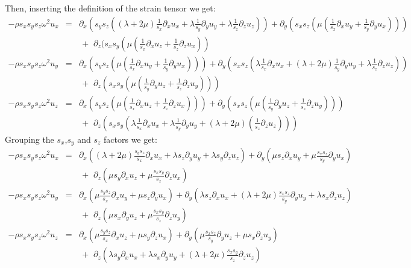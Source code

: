 \documentclass[onecolumn,extra]{gji_modified_cours_UPPA}
\begin{document}
\noindent Then, inserting the definition of the strain tensor we get:
\begin{eqnarray}
-\rho s_x s_y s_z \omega^2 u_x& = &\partial_x (s_y s_z ((\lambda + 2 \mu)\frac{1}{s_x}\partial_x u_x + \lambda\frac{1}{s_y}\partial_y u_y + \lambda\frac{1}{s_z}\partial_z u_z))
+ \partial_y (s_x s_z (\mu (\frac{1}{s_x} \partial_x u_y + \frac{1}{s_y} \partial_y u_x))) \nonumber \\
&\,& \,+\,\, \partial_z (s_x s_y (\mu(\frac{1}{s_x} \partial_x u_z + \frac{1}{s_z}\partial_z u_x)) \nonumber \\
-\rho s_x s_y s_z \omega^2 u_y  & = &  \partial_x (s_y s_z (\mu(\frac{1}{s_x} \partial_x u_y + \frac{1}{s_y}\partial_y u_x)))
+ \partial_y (s_x s_z (\lambda\frac{1}{s_x}\partial_x u_x + (\lambda + 2 \mu)\frac{1}{s_y}\partial_y u_y + \lambda\frac{1}{s_z}\partial_z u_z))\nonumber \\
&\,& \,+\,\, \partial_z (s_x s_y (\mu(\frac{1}{s_y} \partial_y u_z + \frac{1}{s_z} \partial_z u_y))) \nonumber \\
- \rho s_x s_y s_z \omega^2 u_z  & = &  \partial_x (s_y s_z (\mu(\frac{1}{s_x} \partial_x u_z + \frac{1}{s_z} \partial_z u_x)))
+ \partial_y (s_x s_z (\mu(\frac{1}{s_y} \partial_y u_z + \frac{1}{s_z} \partial_z u_y))) \nonumber \\
&\,& \,+\,\, \partial_z (s_x s_y (\lambda\frac{1}{s_x}\partial_x u_x + \lambda\frac{1}{s_y}\partial_y u_y + (\lambda + 2 \mu)(\frac{1}{s_z}\partial_z u_z)))
\end{eqnarray}
\noindent Grouping the $s_x$,$s_y$ and $s_z$ factors we get:
\begin{eqnarray}
-\rho s_x s_y s_z \omega^2 u_x& = &\partial_x ((\lambda + 2 \mu)\frac{s_y s_z}{s_x}\partial_x u_x + \lambda s_z \partial_y u_y + \lambda s_y \partial_z u_z)
+ \partial_y (\mu s_z \partial_x u_y + \mu \frac{s_x s_z}{s_y} \partial_y u_x) \nonumber \\
&\,& \,+\,\, \partial_z (\mu s_y \partial_x u_z + \mu \frac{s_x s_y}{s_z}\partial_z u_x) \nonumber \\
-\rho s_x s_y s_z \omega^2 u_y  & = &  \partial_x (\mu \frac{s_y s_z}{s_x} \partial_x u_y + \mu s_z \partial_y u_x )
+ \partial_y (\lambda s_z \partial_x u_x + (\lambda + 2 \mu)\frac{s_x s_z}{s_y}\partial_y u_y + \lambda s_x \partial_z u_z)\nonumber \\
&\,& \,+\,\, \partial_z ( \mu s_x \partial_y u_z + \mu \frac{s_x s_y}{s_z} \partial_z u_y) \nonumber \\
- \rho s_x s_y s_z \omega^2 u_z  & = &  \partial_x ( \mu \frac{s_y s_z}{s_x} \partial_x u_z + \mu s_y \partial_z u_x )
+ \partial_y ( \mu \frac{s_x s_z}{s_y} \partial_y u_z + \mu s_x \partial_z u_y ) \nonumber \\
&\,& \,+\,\, \partial_z ( \lambda s_y\partial_x u_x + \lambda s_x \partial_y u_y + (\lambda + 2 \mu)\frac{s_x s_y}{s_z}\partial_z u_z)
\end{eqnarray}
\end{document}
